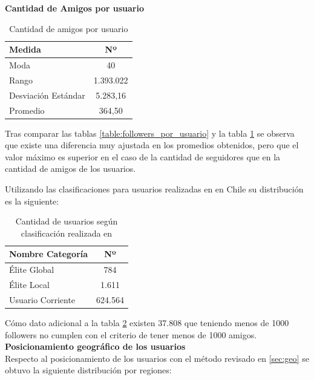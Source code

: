 \textbf{Cantidad de Amigos por usuario} \\

\begin{table}[H]
	\centering
	\begin{tabular}{| l | c |}
		\hline
		Medida   				& Nº\\ \hline 
		Moda    				& 40\\ \hline
		Rango    				& 1.393.022\\ \hline
		Desviación Estándar    	& 5.283,16 \\ \hline
		Promedio   				& 364,50\\ \hline
	\end{tabular}
	\caption {Cantidad de amigos por usuario}
	\label{table:friends_por_usuario}
\end{table}

Tras comparar las tablas \ref{table:followers_por_usuario} y la tabla \ref{table:friends_por_usuario} se observa que existe una diferencia muy ajustada en los promedios obtenidos, pero que el valor máximo es superior en el caso de la cantidad de seguidores que en la cantidad de amigos de los usuarios. 

Utilizando las clasificaciones para usuarios realizadas en \cite{conf/cikm/UysalC11} en Chile su distribución es la siguiente:

\begin{table}[H]
	\centering
	\begin{tabular}{| l | c |}
		\hline
		Nombre Categoría  		& Nº\\ \hline 
		Élite Global   			& 784 \\ \hline 
		Élite Local   				& 1.611\\ \hline
		Usuario Corriente			& 624.564\\ \hline
	\end{tabular}
	\caption {Cantidad de usuarios según clasificación realizada en \cite{conf/cikm/UysalC11}}
	\label{table:cantidad_usuarios_por_clasificacion}
\end{table}

Cómo dato adicional a la tabla \ref{table:cantidad_usuarios_por_clasificacion} existen 37.808 que teniendo menos de 1000 followers no cumplen con el criterio de tener menos de 1000 amigos.\\

\textbf{Posicionamiento geográfico de los usuarios}\\

Respecto al posicionamiento de los usuarios con el método revisado en \ref{sec:geo} se obtuvo la siguiente distribución por regiones:

